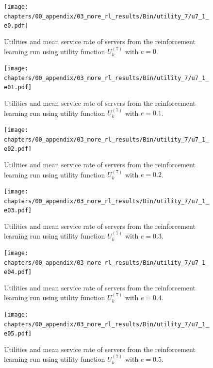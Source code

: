 \begin{figure}[H]
    \texttt{[image: chapters/00\_appendix/03\_more\_rl\_results/Bin/utility\_7/u7\_1\_e0.pdf]}
    \caption{Utilities and mean service rate of servers from the reinforcement
    learning run using utility function \(U_k^{(7)}\) with \(e = 0\).}
    \label{fig:RL_utility7_1_e0}
\end{figure}

\begin{figure}[H]
    \texttt{[image: chapters/00\_appendix/03\_more\_rl\_results/Bin/utility\_7/u7\_1\_e01.pdf]}
    \caption{Utilities and mean service rate of servers from the reinforcement
    learning run using utility function \(U_k^{(7)}\) with \(e = 0.1\).}
    \label{fig:RL_utility7_1_e01}
\end{figure}

\begin{figure}[H]
    \texttt{[image: chapters/00\_appendix/03\_more\_rl\_results/Bin/utility\_7/u7\_1\_e02.pdf]}
    \caption{Utilities and mean service rate of servers from the reinforcement
    learning run using utility function \(U_k^{(7)}\) with \(e = 0.2\).}
    \label{fig:RL_utility7_1_e02}
\end{figure}

\begin{figure}[H]
    \texttt{[image: chapters/00\_appendix/03\_more\_rl\_results/Bin/utility\_7/u7\_1\_e03.pdf]}
    \caption{Utilities and mean service rate of servers from the reinforcement
    learning run using utility function \(U_k^{(7)}\) with \(e = 0.3\).}
    \label{fig:RL_utility7_1_e03}
\end{figure}

\begin{figure}[H]
    \texttt{[image: chapters/00\_appendix/03\_more\_rl\_results/Bin/utility\_7/u7\_1\_e04.pdf]}
    \caption{Utilities and mean service rate of servers from the reinforcement
    learning run using utility function \(U_k^{(7)}\) with \(e = 0.4\).}
    \label{fig:RL_utility7_1_e04}
\end{figure}

\begin{figure}[H]
    \texttt{[image: chapters/00\_appendix/03\_more\_rl\_results/Bin/utility\_7/u7\_1\_e05.pdf]}
    \caption{Utilities and mean service rate of servers from the reinforcement
    learning run using utility function \(U_k^{(7)}\) with \(e = 0.5\).}
    \label{fig:RL_utility7_1_e05}
\end{figure}

